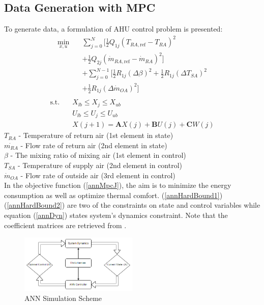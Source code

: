 \documentclass[conference]{IEEEtran}
\begin{document}
\subsection{Data Generation with MPC}
To generate data, a formulation of AHU control problem is presented:
\begin{align}\label{annMpcJ}
\min_{x,u} \quad & \sum_{j=0}^{N}[\frac{1}{2} Q_{1j}(T_{RA,\text{ref}}-T_{RA})^{2} \\ \nonumber 
&+\frac{1}{2} Q_{2j}(\dot{m}_{RA,\text{ref}}-\dot{m}_{RA})^{2}] \\ \nonumber 
&+\sum_{j=0}^{N-1}[\frac{1}{2} R_{1j}(\Delta\beta)^{2} +\frac{1}{2} R_{1j}(\Delta T_{SA})^{2} \\ \nonumber 
&+ \frac{1}{2} R_{1j}(\Delta\dot{m}_{OA})^{2}] \\ \nonumber 
\end{align}
\begin{subequations}
\begin{align}\label{annHardBound1}
\textrm{s.t.} \quad & X_{lb} \leqslant X_{j} \leqslant X_{ub} \\ \label{annHardBound2}
& U_{lb} \leqslant U_{j} \leqslant U_{ub} \\  \label{annDyn}
& X(j+1) = \mathbf{A}X(j) + \mathbf{B}U(j) + \mathbf{C}W(j)
\end{align}
\end{subequations}
$T_{RA}$ - Temperature of return air (1st element in state) \\
$\dot{m_{RA}}$ - Flow rate of return air (2nd element in state) \\
$\beta$ - The mixing ratio of mixing air (1st element in control)\\
$T_{SA}$ - Temperature of supply air (2nd element in control)\\
$\dot{m}_{OA}$ - Flow rate of outside air (3rd element in control)\\

In the objective function (\ref{annMpcJ}), the aim is to minimize the energy consumption as well as optimize thermal comfort. (\ref{annHardBound1})(\ref{annHardBound2}) are two of the constraints on state and control variables while equation (\ref{annDyn}) states system's dynamics constraint. Note that the coefficient matrices are retrieved from \cite{liang2014modeling}.

\begin{figure}[htbp]
\centering
\includegraphics[width=0.5\textwidth]{Figures/ANN_Scheme.png}
\caption{ANN Simulation Scheme}
\label{fig:ANNmethod}
\end{figure}
\end{document}
